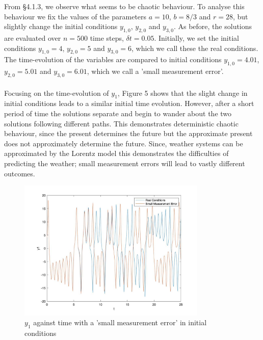 \documentclass[a4paper,11pt]{article}
\begin{document}
From \S 4.1.3, we observe what seems to be chaotic behaviour. To analyse this behaviour we fix the values of the parameters $a=10$, $b=8/3$ and $r=28$, but slightly change the initial conditions  $y_{1,0}$, $y_{2,0}$ and $y_{3,0}$. As before, the solutions are evaluated over $n=500$ time steps, $\delta t=0.05$. Initially, we set the initial conditions $y_{1,0}=4$, $y_{2,0}=5$ and $y_{3,0}=6$, which we call these the real conditions. The time-evolution of the variables are compared to initial conditions $y_{1,0}=4.01$, $y_{2,0}=5.01$ and $y_{3,0}=6.01$, which we call a 'small measurement error'.\\
\\
Focusing on the time-evolution of $y_{1}$, Figure 5 shows that the slight change in initial conditions leads to a similar initial time evolution. However, after a short period of time the solutions separate and begin to wander about the two solutions following different paths. This demonstrates deterministic chaotic behaviour, since the present determines the future but the approximate present does not approximately determine the future. Since, weather systems can be approximated by the Lorentz model this demonstrates the difficulties of predicting the weather; small measurement errors will lead to vastly different outcomes.

\begin{figure}

     \centering
         \includegraphics[width=0.8\textwidth]{r28_y1_timeX}
         \caption{$y_{1}$ against time with a 'small measurement error' in initial conditions}

\end{figure}



\clearpage
\end{document}
